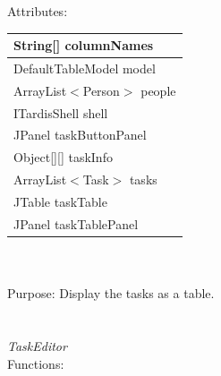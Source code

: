 Attributes:\\
\begin{tabular}{| l |}
\hline
String[] columnNames\\
\hline
DefaultTableModel model\\
\hline
ArrayList$<$Person$>$ people\\
\hline
ITardisShell shell\\
\hline
JPanel taskButtonPanel\\
\hline
Object[][] taskInfo\\
\hline
ArrayList$<$Task$>$ tasks\\
\hline
JTable taskTable\\
\hline
JPanel taskTablePanel\\
\hline
\end{tabular}\\
\\
Purpose: Display the tasks as a table.\\
\\
\\
\emph{TaskEditor}\\
Functions:\\
